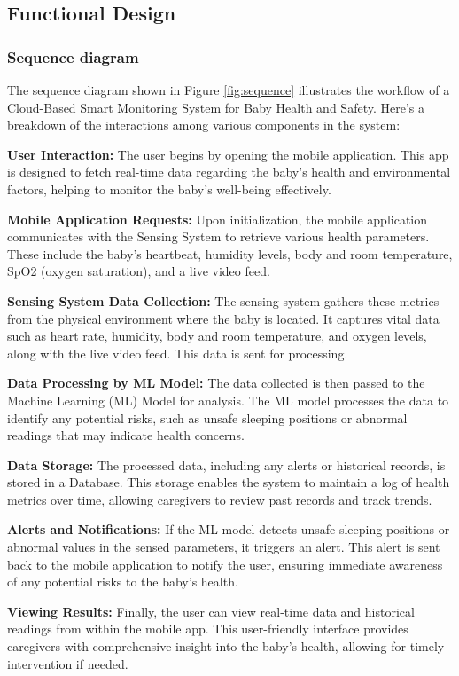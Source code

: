 \documentclass[conference]{IEEEtran}
\begin{document}
\subsection{Functional Design}
\subsubsection{Sequence diagram}

The sequence diagram shown in Figure \ref{fig:sequence} illustrates the workflow of a Cloud-Based Smart Monitoring System for Baby Health and Safety. Here’s a breakdown of the interactions among various components in the system:

\textbf{User Interaction:} The user begins by opening the mobile application. This app is designed to fetch real-time data regarding the baby’s health and environmental factors, helping to monitor the baby’s well-being effectively.

\textbf{Mobile Application Requests:} Upon initialization, the mobile application communicates with the Sensing System to retrieve various health parameters. These include the baby’s heartbeat, humidity levels, body and room temperature, SpO2 (oxygen saturation), and a live video feed.

\textbf{Sensing System Data Collection:} The sensing system gathers these metrics from the physical environment where the baby is located. It captures vital data such as heart rate, humidity, body and room temperature, and oxygen levels, along with the live video feed. This data is sent for processing.

\textbf{Data Processing by ML Model:} The data collected is then passed to the Machine Learning (ML) Model for analysis. The ML model processes the data to identify any potential risks, such as unsafe sleeping positions or abnormal readings that may indicate health concerns.

\textbf{Data Storage:} The processed data, including any alerts or historical records, is stored in a Database. This storage enables the system to maintain a log of health metrics over time, allowing caregivers to review past records and track trends.

\textbf{Alerts and Notifications:} If the ML model detects unsafe sleeping positions or abnormal values in the sensed parameters, it triggers an alert. This alert is sent back to the mobile application to notify the user, ensuring immediate awareness of any potential risks to the baby’s health.

\textbf{Viewing Results:} Finally, the user can view real-time data and historical readings from within the mobile app. This user-friendly interface provides caregivers with comprehensive insight into the baby’s health, allowing for timely intervention if needed.
\end{document}
